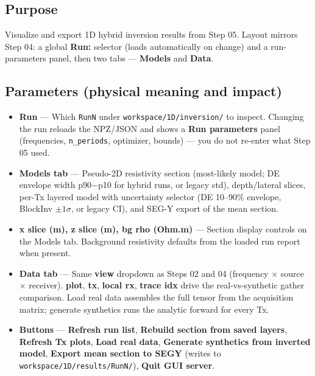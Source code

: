 \documentclass[11pt,a4paper]{article}
\begin{document}
\subsection{Purpose}

Visualize and export 1D hybrid inversion results from Step 05. Layout mirrors Step 04: a global \textbf{Run:} selector (loads automatically on change) and a run-parameters panel, then two tabs — \textbf{Models} and \textbf{Data}.

\subsection{Parameters (physical meaning and impact)}

\begin{itemize}

  \item \textbf{Run} — Which \texttt{RunN} under \texttt{workspace/1D/inversion/} to inspect. Changing the run reloads the NPZ/JSON and shows a \textbf{Run parameters} panel (frequencies, \texttt{n\_periods}, optimizer, bounds) — you do not re-enter what Step 05 used.

  \item \textbf{Models tab} — Pseudo-2D resistivity section (most-likely model; DE envelope width p90$-$p10 for hybrid runs, or legacy std), depth/lateral slices, per-Tx layered model with uncertainty selector (DE 10--90\% envelope, BlockInv $\pm 1\sigma$, or legacy CI), and SEG-Y export of the mean section.

  \item \textbf{x slice (m), z slice (m), bg rho (Ohm.m)} — Section display controls on the Models tab. Background resistivity defaults from the loaded run report when present.

  \item \textbf{Data tab} — Same \textbf{view} dropdown as Steps 02 and 04 (frequency $\times$ source $\times$ receiver). \textbf{plot}, \textbf{tx}, \textbf{local rx}, \textbf{trace idx} drive the real-vs-synthetic gather comparison. Load real data assembles the full tensor from the acquisition matrix; generate synthetics runs the analytic forward for every Tx.

  \item \textbf{Buttons} — \textbf{Refresh run list}, \textbf{Rebuild section from saved layers}, \textbf{Refresh Tx plots}, \textbf{Load real data}, \textbf{Generate synthetics from inverted model}, \textbf{Export mean section to SEGY} (writes to \texttt{workspace/1D/results/RunN/}), \textbf{Quit GUI server}.

\end{itemize}
\end{document}
